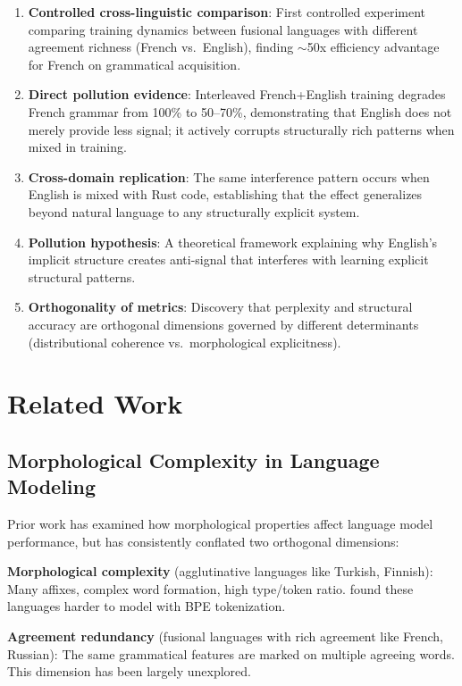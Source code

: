\documentclass[11pt,a4paper]{article}
\begin{document}
\begin{enumerate}
    \item \textbf{Controlled cross-linguistic comparison}: First controlled experiment comparing training dynamics between fusional languages with different agreement richness (French vs.\ English), finding $\sim$50x efficiency advantage for French on grammatical acquisition.
    \item \textbf{Direct pollution evidence}: Interleaved French+English training degrades French grammar from 100\% to 50--70\%, demonstrating that English does not merely provide less signal; it actively corrupts structurally rich patterns when mixed in training.
    \item \textbf{Cross-domain replication}: The same interference pattern occurs when English is mixed with Rust code, establishing that the effect generalizes beyond natural language to any structurally explicit system.
    \item \textbf{Pollution hypothesis}: A theoretical framework explaining why English's implicit structure creates anti-signal that interferes with learning explicit structural patterns.
    \item \textbf{Orthogonality of metrics}: Discovery that perplexity and structural accuracy are orthogonal dimensions governed by different determinants (distributional coherence vs.\ morphological explicitness).
\end{enumerate}

\section{Related Work}

\subsection{Morphological Complexity in Language Modeling}

Prior work has examined how morphological properties affect language model performance, but has consistently conflated two orthogonal dimensions:

\textbf{Morphological complexity} (agglutinative languages like Turkish, Finnish): Many affixes, complex word formation, high type/token ratio. \cite{park2021morphology} found these languages harder to model with BPE tokenization.

\textbf{Agreement redundancy} (fusional languages with rich agreement like French, Russian): The same grammatical features are marked on multiple agreeing words. This dimension has been largely unexplored.
\end{document}
